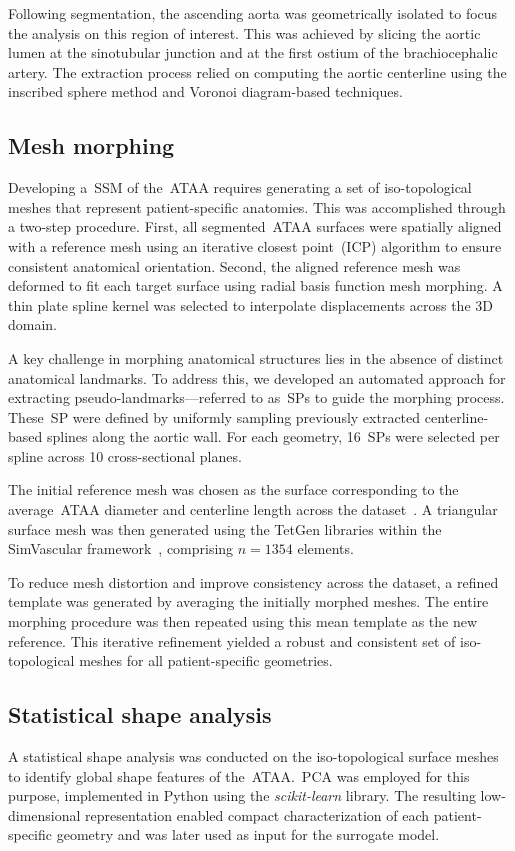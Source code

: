 \documentclass[a4paper,fleqn]{cas-sc}
\begin{document}
  Following segmentation, the ascending aorta was geometrically isolated to focus the analysis on this region of interest. This was achieved by slicing the aortic lumen at the sinotubular junction and at the first ostium of the brachiocephalic artery. The extraction process relied on computing the aortic centerline using the inscribed sphere method and Voronoi diagram-based techniques.

\subsection{Mesh morphing}
  Developing a~\gls{SSM} of the~\gls{ATAA} requires generating a set of iso-topological meshes that represent patient-specific anatomies. This was accomplished through a two-step procedure. First, all segmented~\gls{ATAA} surfaces were spatially aligned with a reference mesh using an iterative closest point~(\gls{ICP}) algorithm to ensure consistent anatomical orientation. Second, the aligned reference mesh was deformed to fit each target surface using radial basis function mesh morphing. A thin plate spline kernel was selected to interpolate displacements across the 3D domain.

  A key challenge in morphing anatomical structures lies in the absence of distinct anatomical landmarks. To address this, we developed an automated approach for extracting pseudo-landmarks—referred to as~\glspl{SP} to guide the morphing process. These~\gls{SP} were defined by uniformly sampling previously extracted centerline-based splines along the aortic wall. For each geometry, 16~\glspl{SP} were selected per spline across 10 cross-sectional planes.

  The initial reference mesh was chosen as the surface corresponding to the average~\gls{ATAA} diameter and centerline length across the dataset~\cite{Geronzi2023_dy,GRASSI2011112}. A triangular surface mesh was then generated using the TetGen libraries within the SimVascular framework~\cite{updegrove2017}, comprising $n = 1354$ elements.

  To reduce mesh distortion and improve consistency across the dataset, a refined template was generated by averaging the initially morphed meshes. The entire morphing procedure was then repeated using this mean template as the new reference. This iterative refinement yielded a robust and consistent set of iso-topological meshes for all patient-specific geometries.

\subsection{Statistical shape analysis}
  A statistical shape analysis was conducted on the iso-topological surface meshes to identify global shape features of the~\gls{ATAA}.~\gls{PCA} was employed for this purpose, implemented in Python using the \textit{scikit-learn} library. The resulting low-dimensional representation enabled compact characterization of each patient-specific geometry and was later used as input for the surrogate model.
\end{document}
